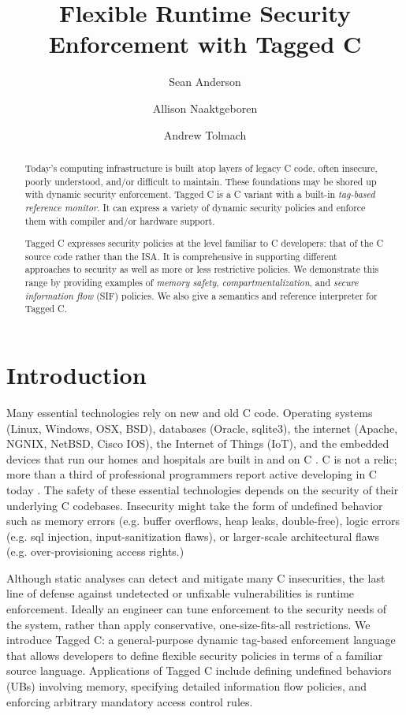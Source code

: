 \documentclass{llncs}
\title{Flexible Runtime Security Enforcement with Tagged C}
\author{Sean Anderson \and Allison Naaktgeboren \and Andrew Tolmach}
\institute{Portland State University}
\begin{document}





\maketitle

\begin{abstract}
Today's computing infrastructure is built atop layers of legacy C code, often
insecure, poorly understood, and/or difficult to maintain.
These foundations may be shored up with dynamic security enforcement.
Tagged C is a C variant with a built-in {\em tag-based reference monitor}.
It can express a variety of dynamic security policies and enforce them with
compiler and/or hardware support.

Tagged C expresses security policies at the level familiar to C developers: that
of the C source code rather than the ISA. It is comprehensive in supporting different
approaches to security as well as more or less restrictive policies. We demonstrate
this range by providing examples of {\em memory safety}, {\em compartmentalization},
and {\em secure information flow} (SIF) policies. We also give a semantics and reference
interpreter for Tagged C.
\end{abstract}

\section{Introduction}
Many essential technologies rely on new and old C code. 
Operating systems (Linux, Windows, OSX, BSD), databases (Oracle, sqlite3), the internet
(Apache, NGNIX, NetBSD, Cisco IOS), the Internet of Things (IoT), and the 
embedded devices that run our homes and hospitals are built in and on C \cite{Munoz:PoweredbyC}. 
C is not a relic; more than a third of professional programmers report active developing
in C today \cite{stackoverflow22:dev-survey}. The safety of these essential technologies
depends on the security of their underlying C codebases. Insecurity might take the form of
undefined behavior such as memory errors (e.g. buffer overflows, heap leaks, double-free),
logic errors (e.g. sql injection, input-sanitization flaws), or
larger-scale architectural flaws (e.g. over-provisioning access rights.)

Although static analyses can detect and mitigate many C insecurities, the last line of defense against
undetected or unfixable vulnerabilities is runtime enforcement. Ideally an engineer can
tune enforcement to the security needs of the system, rather than apply conservative, one-size-fits-all 
restrictions. 
We introduce Tagged C: a general-purpose dynamic tag-based enforcement language
that allows developers to define flexible security policies in terms of a familiar source language.
Applications of Tagged C include defining undefined behaviors (UBs) involving memory,
specifying detailed information flow policies, and enforcing arbitrary mandatory access control rules. %
\end{document}
